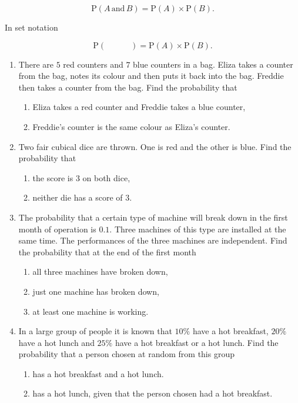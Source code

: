 \[
\text{P}(A \,\text{and}\, B) =  \text{P}(A) \times  \text{P}(B).
\]

In set notation

\[
\text{P}(\qquad\quad ) =  \text{P}(A) \times  \text{P}(B).
\]

\exercise  %

\begin{enumerate}
	\item There are $5$ red counters and $7$ blue counters in a bag. Eliza takes a  counter from the bag, notes its colour and then puts it back into the bag. Freddie then takes a counter from the bag. Find the probability that
	\begin{enumerate}
		\item Eliza takes a red counter and Freddie  takes a blue counter,
		\item Freddie's counter is the same colour as Eliza's counter.
	\end{enumerate}


\item Two fair cubical dice are thrown. One is red and the other is blue. Find the probability that 

\begin{enumerate}
	\item the score is $3$ on both dice,
	\item neither die has a score of $3$.
\end{enumerate}


\item The probability that a certain type of machine will break down in the first month of operation is $0.1$. Three machines of this type are installed at the same time. The performances of the three machines are independent. Find the probability that at the end of the first month
\begin{enumerate}
	\item all three machines have broken down,
	\item just one machine has broken down,
	\item at least one machine is working.
\end{enumerate}

\item In a large group of people it is known that $10\%$ have a hot breakfast, $20\%$ have a hot lunch and $25\%$ have a hot breakfast or a hot lunch. Find the probability that a person chosen at random from this group

\begin{enumerate}
	\item has a hot breakfast and a hot lunch.
	\item has a hot lunch, given that the person chosen had a hot breakfast.
\end{enumerate}


\end{enumerate}
